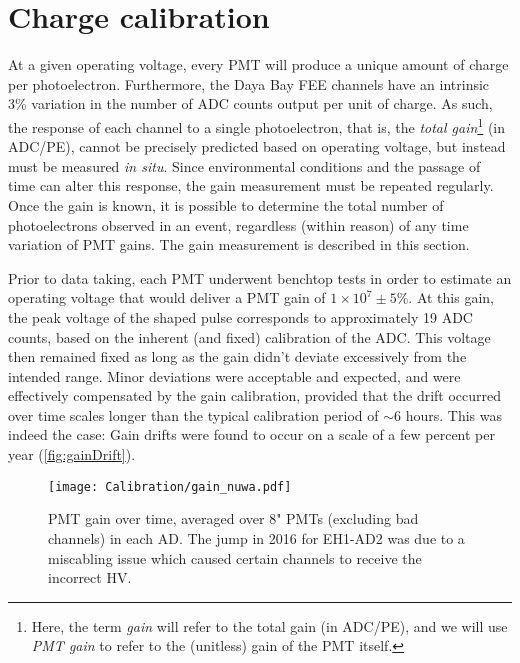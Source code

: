 \documentclass[../thesis.tex]{subfiles}
\begin{document}
\section{Charge calibration}
\label{sec:calibGain}

At a given operating voltage, every PMT will produce a unique amount of charge per photoelectron. Furthermore, the Daya Bay FEE channels have an intrinsic 3\% variation in the number of ADC counts output per unit of charge. As such, the response of each channel to a single photoelectron, that is, the \emph{total gain}\footnote{Here, the term \emph{gain} will refer to the total gain (in ADC/PE), and we will use \emph{PMT gain} to refer to the (unitless) gain of the PMT itself.} (in ADC/PE), cannot be precisely predicted based on operating voltage, but instead must be measured \emph{in situ}. Since environmental conditions and the passage of time can alter this response, the gain measurement must be repeated regularly. Once the gain is known, it is possible to determine the total number of photoelectrons observed in an event, regardless (within reason) of any time variation of PMT gains. The gain measurement is described in this section.

Prior to data taking, each PMT underwent benchtop tests in order to estimate an operating voltage that would deliver a PMT gain of $1 \times 10^7 \pm 5\%$. At this gain, the peak voltage of the shaped pulse corresponds to approximately 19 ADC counts, based on the inherent (and fixed) calibration of the ADC. This voltage then remained fixed as long as the gain didn't deviate excessively from the intended range. Minor deviations were acceptable and expected, and were effectively compensated by the gain calibration, provided that the drift occurred over time scales longer than the typical calibration period of $\sim$6 hours. This was indeed the case: Gain drifts were found to occur on a scale of a few percent per year (\autoref{fig:gainDrift}).

\begin{figure}[h]
  \texttt{[image: Calibration/gain\_nuwa.pdf]}
  \caption{PMT gain over time, averaged over 8" PMTs (excluding bad channels) in each AD. The jump in 2016 for EH1-AD2 was due to a miscabling issue which caused certain channels to receive the incorrect HV.}
  \label{fig:gainDrift}
\end{figure}
\end{document}
